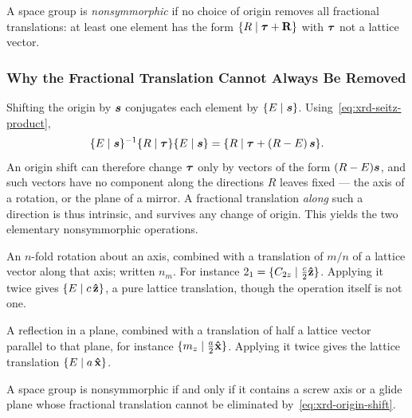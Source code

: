 \begin{definition}
A space group is \emph{nonsymmorphic} if no choice of origin removes all fractional translations: at least one element has the form $\{R \mid \lvect{\tau} + \cvect{R}\}$ with $\bm{\tau}$ not a lattice vector.
\end{definition}

\subsubsection{Why the Fractional Translation Cannot Always Be Removed}

Shifting the origin by $\bm{s}$ conjugates each element by $\{E\mid\bm{s}\}$. Using~\eqref{eq:xrd-seitz-product},
\begin{equation}
    \{E\mid\bm{s}\}^{-1}\{R\mid\bm{\tau}\}\{E\mid\bm{s}\}
    = \{R \mid \bm{\tau} + (R-E)\,\bm{s}\}.
    \label{eq:xrd-origin-shift}
\end{equation}
An origin shift can therefore change $\bm{\tau}$ only by vectors of the form $(R-E)\bm{s}$, and such vectors have no component along the directions $R$ leaves fixed --- the axis of a rotation, or the plane of a mirror. A fractional translation \emph{along} such a direction is thus intrinsic, and survives any change of origin. This yields the two elementary nonsymmorphic operations.

\begin{definition}
An $n$-fold rotation about an axis, combined with a translation of $m/n$ of a lattice vector along that axis; written $n_m$. For instance $2_1 = \{C_{2z} \mid \tfrac{c}{2}\boldsymbol{\hat{\textbf{z}}}\}$. Applying it twice gives $\{E \mid c\,\boldsymbol{\hat{\textbf{z}}}\}$, a pure lattice translation, though the operation itself is not one.
\end{definition}

\begin{definition}
A reflection in a plane, combined with a translation of half a lattice vector parallel to that plane, for instance $\{m_z \mid \tfrac{a}{2}\boldsymbol{\hat{\textbf{x}}}\}$. Applying it twice gives the lattice translation $\{E \mid a\,\boldsymbol{\hat{\textbf{x}}}\}$.
\end{definition}

\begin{fact}[Criterion]
A space group is nonsymmorphic if and only if it contains a screw axis or a glide plane whose fractional translation cannot be eliminated by~\eqref{eq:xrd-origin-shift}.
\end{fact}

